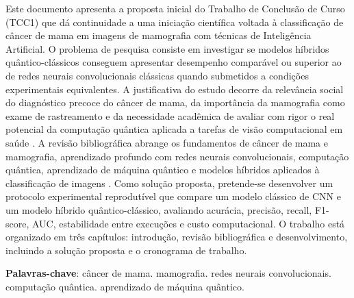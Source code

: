 \documentclass[
    12pt,
    openright,
    oneside,
    a4paper,
    english,
    brazil
]{abntex2}
\begin{document}
\frenchspacing

\pretextual
\imprimircapa
\imprimirfolhaderosto

\begin{resumo}
Este documento apresenta a proposta inicial do Trabalho de Conclusão de Curso (TCC1) que dá continuidade a uma iniciação científica voltada à classificação de câncer de mama em imagens de mamografia com técnicas de Inteligência Artificial. O problema de pesquisa consiste em investigar se modelos híbridos quântico-clássicos conseguem apresentar desempenho comparável ou superior ao de redes neurais convolucionais clássicas quando submetidos a condições experimentais equivalentes. A justificativa do estudo decorre da relevância social do diagnóstico precoce do câncer de mama, da importância da mamografia como exame de rastreamento e da necessidade acadêmica de avaliar com rigor o real potencial da computação quântica aplicada a tarefas de visão computacional em saúde \cite{WHO2025BreastCancer,INCA2025Rastreamento}. A revisão bibliográfica abrange os fundamentos de câncer de mama e mamografia, aprendizado profundo com redes neurais convolucionais, computação quântica, aprendizado de máquina quântico e modelos híbridos aplicados à classificação de imagens \cite{LeCun2015,Gupta2025QMLDigitalHealth,Long2025QCQCNN}. Como solução proposta, pretende-se desenvolver um protocolo experimental reprodutível que compare um modelo clássico de CNN e um modelo híbrido quântico-clássico, avaliando acurácia, precisão, recall, F1-score, AUC, estabilidade entre execuções e custo computacional. O trabalho está organizado em três capítulos: introdução, revisão bibliográfica e desenvolvimento, incluindo a solução proposta e o cronograma de trabalho.

\vspace{\onelineskip}
\noindent
\textbf{Palavras-chave}: câncer de mama. mamografia. redes neurais convolucionais. computação quântica. aprendizado de máquina quântico.
\end{resumo}

\tableofcontents*
\cleardoublepage

\textual

\end{document}
